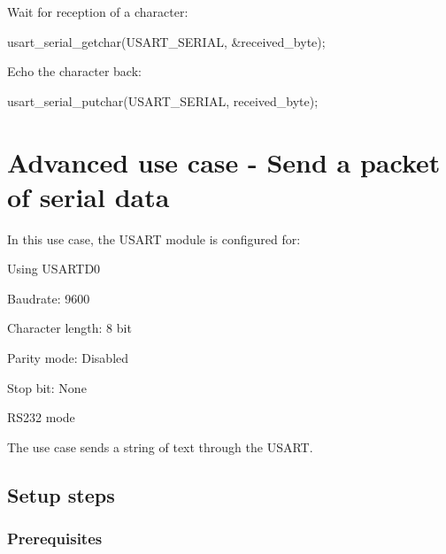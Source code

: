 \begin{DoxyEnumerate}
\item Wait for reception of a character\+:
\begin{DoxyItemize}
\item 
\begin{DoxyCode}
usart\_serial\_getchar(USART\_SERIAL, &received\_byte); 
\end{DoxyCode}

\end{DoxyItemize}
\item Echo the character back\+:
\begin{DoxyItemize}
\item 
\begin{DoxyCode}
usart\_serial\_putchar(USART\_SERIAL, received\_byte); 
\end{DoxyCode}
 
\end{DoxyItemize}
\end{DoxyEnumerate}\hypertarget{serial_use_case_1}{}\section{Advanced use case -\/ Send a packet of serial data}\label{serial_use_case_1}
In this use case, the U\+S\+A\+R\+T module is configured for\+:
\begin{DoxyItemize}
\item Using U\+S\+A\+R\+T\+D0
\item Baudrate\+: 9600
\item Character length\+: 8 bit
\item Parity mode\+: Disabled
\item Stop bit\+: None
\item R\+S232 mode
\end{DoxyItemize}

The use case sends a string of text through the U\+S\+A\+R\+T.\hypertarget{serial_use_case_1_serial_use_case_1_setup}{}\subsection{Setup steps}\label{serial_use_case_1_serial_use_case_1_setup}
\hypertarget{serial_use_case_1_serial_use_case_1_setup_prereq}{}\subsubsection{Prerequisites}\label{serial_use_case_1_serial_use_case_1_setup_prereq}

